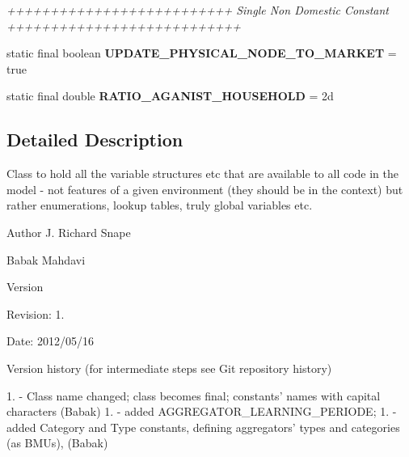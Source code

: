 \begin{DoxyCompactItemize}
\begin{DoxyCompactList}\small\item\em ++++++++++++++++++++++++++ Single Non Domestic Constant +++++++++++++++++++++++++++ \end{DoxyCompactList}\item 
\hypertarget{classuk_1_1ac_1_1dmu_1_1iesd_1_1cascade_1_1base_1_1_consts_ab7e5ab0d0393a782efb667521dcef898}{static final boolean {\bfseries U\-P\-D\-A\-T\-E\-\_\-\-P\-H\-Y\-S\-I\-C\-A\-L\-\_\-\-N\-O\-D\-E\-\_\-\-T\-O\-\_\-\-M\-A\-R\-K\-E\-T} = true}\label{classuk_1_1ac_1_1dmu_1_1iesd_1_1cascade_1_1base_1_1_consts_ab7e5ab0d0393a782efb667521dcef898}

\item 
\hypertarget{classuk_1_1ac_1_1dmu_1_1iesd_1_1cascade_1_1base_1_1_consts_afbc77e0e1208df0cc8116adb04aa45dc}{static final double {\bfseries R\-A\-T\-I\-O\-\_\-\-A\-G\-A\-N\-I\-S\-T\-\_\-\-H\-O\-U\-S\-E\-H\-O\-L\-D} = 2d}\label{classuk_1_1ac_1_1dmu_1_1iesd_1_1cascade_1_1base_1_1_consts_afbc77e0e1208df0cc8116adb04aa45dc}

\end{DoxyCompactItemize}


\subsection{Detailed Description}
Class to hold all the variable structures etc that are available to all code in the model -\/ not features of a given environment (they should be in the context) but rather enumerations, lookup tables, truly global variables etc. 

\begin{DoxyAuthor}{Author}
J. Richard Snape 

Babak Mahdavi 
\end{DoxyAuthor}
\begin{DoxyVersion}{Version}

\end{DoxyVersion}
\begin{DoxyParagraph}{Revision\-:}
1. 
\end{DoxyParagraph}
\begin{DoxyParagraph}{Date\-:}
2012/05/16 
\end{DoxyParagraph}


Version history (for intermediate steps see Git repository history)

1. -\/ Class name changed; class becomes final; constants' names with capital characters (Babak) 1. -\/ added A\-G\-G\-R\-E\-G\-A\-T\-O\-R\-\_\-\-L\-E\-A\-R\-N\-I\-N\-G\-\_\-\-P\-E\-R\-I\-O\-D\-E; 1. -\/ added Category and Type constants, defining aggregators' types and categories (as B\-M\-Us), (Babak) 

